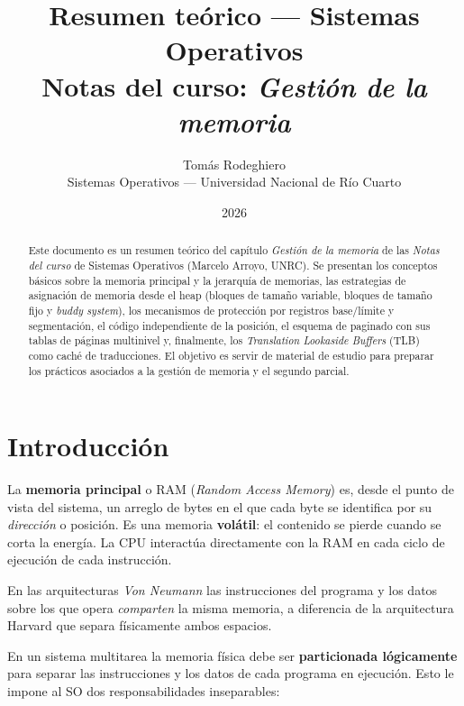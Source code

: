 \documentclass[11pt,a4paper]{article}
\title{
    \vspace{-2.5em}
    \textbf{Resumen teórico --- Sistemas Operativos} \\[0.3em]
    \large Notas del curso: \emph{Gestión de la memoria}
}
\author{
    Tomás Rodeghiero \\
    \small Sistemas Operativos --- Universidad Nacional de Río Cuarto
}
\date{2026}
\begin{document}
\maketitle

\begin{abstract}
\noindent
Este documento es un resumen teórico del capítulo \emph{Gestión de la
memoria} de las \emph{Notas del curso} de Sistemas Operativos (Marcelo
Arroyo, UNRC). Se presentan los conceptos básicos sobre la memoria
principal y la jerarquía de memorias, las estrategias de asignación de
memoria desde el heap (bloques de tamaño variable, bloques de tamaño
fijo y \emph{buddy system}), los mecanismos de protección por registros
base/límite y segmentación, el código independiente de la posición, el
esquema de paginado con sus tablas de páginas multinivel y, finalmente,
los \emph{Translation Lookaside Buffers} (TLB) como caché de
traducciones. El objetivo es servir de material de estudio para preparar
los prácticos asociados a la gestión de memoria y el segundo parcial.
\end{abstract}

\tableofcontents
\bigskip

\section{Introducción}

La \textbf{memoria principal} o RAM (\emph{Random Access Memory}) es,
desde el punto de vista del sistema, un arreglo de bytes en el que cada
byte se identifica por su \emph{dirección} o posición. Es una memoria
\textbf{volátil}: el contenido se pierde cuando se corta la energía.
La CPU interactúa directamente con la RAM en cada ciclo de ejecución
de cada instrucción.

\begin{idea}
En las arquitecturas \emph{Von Neumann} las instrucciones del programa
y los datos sobre los que opera \emph{comparten} la misma memoria, a
diferencia de la arquitectura Harvard que separa físicamente ambos
espacios.
\end{idea}

En un sistema multitarea la memoria física debe ser
\textbf{particionada lógicamente} para separar las instrucciones y los
datos de cada programa en ejecución. Esto le impone al SO dos
responsabilidades inseparables:
\end{document}
